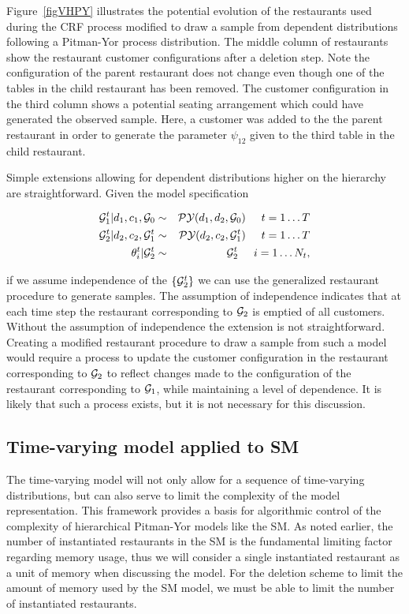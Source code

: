Figure~\ref{figVHPY} illustrates the potential evolution of the restaurants used during the CRF process modified to draw a sample from dependent distributions following a Pitman-Yor process distribution.  The middle column of restaurants show the restaurant customer configurations after a deletion step.  Note the configuration of the parent restaurant does not change even though one of the tables in the child restaurant has been removed.  The customer configuration in the third column shows a potential seating arrangement which could have generated the observed sample.  Here, a customer was added to the the parent restaurant in order to generate the parameter $\psi_{12}$  given to the third table in the child restaurant.

Simple extensions allowing for dependent distributions higher on the hierarchy are straightforward.  Given the model specification

\begin{eqnarray*}
\G_1^t | d_1, c_1, \G_0  &\sim& \PY(d_1,d_2,\G_0) \hspace{.5cm} t = 1\dots T\\
\G_2^t | d_2, c_2, \G_1^t &\sim& \PY(d_2, c_2, \G_1^t)  \hspace{.5cm} t = 1\dots T\\
\theta^t_i | \G_2^t &\sim& \G_2^t \hspace{.5cm} i = 1\dots N_t, 
\end{eqnarray*}

if we assume independence of the $\{ \G_2^t \}$ we can use the generalized restaurant procedure to generate samples. The assumption of independence indicates that at each time step the restaurant corresponding to $\G_2$ is emptied of all customers. Without the assumption of independence the extension is not straightforward. Creating a modified restaurant procedure to draw a sample from such a model would require a process to update the customer configuration in the restaurant corresponding to $\G_2$ to reflect changes made to the configuration of the restaurant corresponding to $\G_1$, while maintaining a level of dependence.  It is likely that such a process exists, but it is not necessary for this discussion.

\subsection{Time-varying model applied to SM}

The time-varying model will not only allow for a sequence of time-varying distributions, but can also serve to limit the complexity of the model representation. This framework provides a basis for algorithmic control of the complexity of hierarchical Pitman-Yor models like the SM.  As noted earlier, the number of instantiated restaurants in the SM is the fundamental limiting factor regarding memory usage, thus we will consider a single instantiated restaurant as a unit of memory when discussing the model. For the deletion scheme to limit the amount of memory used by the SM model, we must be able to limit the number of instantiated restaurants.

